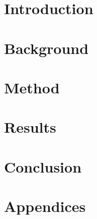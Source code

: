 



\frontmatter{}

%



\pagebreak

\tableofcontents*



\mainmatter{}


%

\chapter{Introduction}




\chapter{Background}


\chapter{Method}


\chapter{Results}


\chapter{Conclusion}


\chapter*{Appendices}

\renewcommand{\thesection}{\Alph{section}}
\setcounter{section}{0}





%
\nocite{*}



